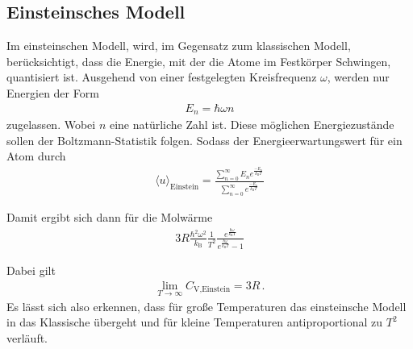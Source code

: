 \subsection{Einsteinsches Modell}
\label{subsec:einstein}
Im einsteinschen Modell, wird, im Gegensatz zum klassischen
Modell, berücksichtigt, dass die Energie, mit
der die Atome im Festkörper Schwingen, quantisiert ist.
Ausgehend von einer festgelegten Kreisfrequenz $\omega$,
werden nur Energien der Form
\begin{align*}
	E_{n} = \hbar \omega n
\end{align*}
zugelassen. Wobei $n$ eine natürliche Zahl ist.
Diese möglichen Energiezustände sollen der Boltzmann-Statistik
folgen. Sodass der Energieerwartungswert für ein Atom durch
\begin{align}
	\langle u \rangle_{\text{Einstein}} = \frac{\sum^{\infty}_{n = 0}
	E_{n} e^{\frac{-E_{n}}{k_{\text{B}} T}}}{\sum^{\infty}_{n = 0}
	e^{\frac{-E_{n}}{k_{\text{B}} T}}} \label{eqn:5}
\end{align}

Damit ergibt sich dann für die Molwärme
\begin{align}
	3 R \frac{\hbar^{2} \omega^{2}}{k_{\text{B}}} \frac{1}{T^{2}}
	\frac{e^{\frac{\hbar \omega}{k_{\text{B}} T}}}{e^{\frac{\hbar \omega}{k_{\text{B}} T}} - 1}\label{eqn:t7}
\end{align}

Dabei gilt
\begin{align}
	\lim_{T \rightarrow \infty} C_{\text{V,Einstein}} = 3R \, . \label{eqn:t8}
\end{align}
Es lässt sich also erkennen, dass  für große Temperaturen
das einsteinsche Modell in das Klassische übergeht und für kleine Temperaturen
antiproportional zu $T^2$ verläuft.

